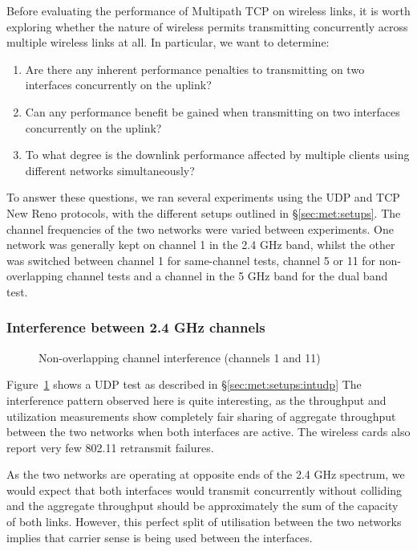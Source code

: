 Before evaluating the performance of Multipath TCP on wireless links, it is
worth exploring whether the nature of wireless permits transmitting concurrently
across multiple wireless links at all. In particular, we want to determine:

\begin{enumerate}
  \item Are there any inherent performance penalties to transmitting on two
    interfaces concurrently on the uplink?
  \item Can any performance benefit be gained when transmitting on two
    interfaces concurrently on the uplink?
  \item To what degree is the downlink performance affected by multiple clients
    using different networks simultaneously?
\end{enumerate}

To answer these questions, we ran several experiments using the UDP and TCP New 
Reno protocols, with the different setups outlined in \S\ref{sec:met:setups}.      %
The channel frequencies of the two networks were varied between experiments. One
network was generally kept on channel 1 in the 2.4 GHz band, whilst the other
was switched between channel 1 for same-channel tests, channel 5 or 11 for
non-overlapping channel tests and a channel in the 5 GHz band for the dual band 
test. 

\subsubsection{Interference between 2.4 GHz channels}

\begin{figure}[h]
 \centering
 
 \caption{Non-overlapping channel interference (channels 1 and 11)}\label{graph:cc-interference}
\end{figure}

Figure~\ref{graph:cc-interference} shows a UDP test as described in 
\S\ref{sec:met:setups:intudp}
The interference pattern observed here is quite interesting, as the throughput
and utilization measurements show completely fair sharing of aggregate
throughput between the two networks when both interfaces are active. The
wireless cards also report very few 802.11 retransmit failures.

As the two networks are operating at opposite ends of the 2.4 GHz spectrum, we
would expect that both interfaces would transmit concurrently without colliding
and the aggregate throughput should be approximately the sum of the capacity of
both links. However, this perfect split of utilisation between the two networks
implies that carrier sense is being used between the interfaces.

